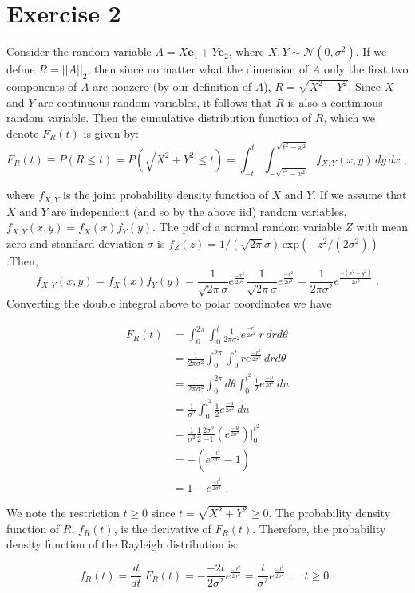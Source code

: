 \documentclass[11pt]{article}
\begin{document}
\section*{Exercise 2}

Consider the random variable $A = X\textbf{e}_1 + Y \textbf{e}_2$, where $X,Y \sim \mathcal{N}(0,\sigma^2)$. If we define $R = ||A||_2$, then since no matter what the dimension of $A$ only the first two components of $A$ are nonzero (by our definition of $A$), $R = \sqrt{X^2 + Y^2}$. Since $X$ and $Y$ are continuous random variables, it follows that $R$ is also a continuous random variable. Then the cumulative distribution function of $R$, which we denote $F_R(t)$ is given by:
$$F_R(t) \equiv P(R \leq t) = P(\sqrt{X^2 + Y^2} \leq t) = \int_{-t}^{t} \int_{-\sqrt{t^2-x^2}}^{\sqrt{t^2-x^2}} f_{X,Y}(x,y) \, dy \, dx \;,$$

where $f_{X,Y}$ is the joint probability density function of $X$ and $Y$. If we assume that $X$ and $Y$ are independent (and so by the above iid) random variables, $f_{X,Y}(x,y) = f_X(x)f_Y(y)$. The pdf of a normal random variable $Z$ with mean zero and standard deviation $\sigma$ is $f_Z(z) = 1/(\sqrt{2\pi}\sigma) \,\text{exp}(-z^2/(2\sigma^2))$.Then, $$f_{X,Y}(x,y) = f_X(x)f_Y(y) = \frac{1}{\sqrt{2\pi}\sigma} e^\frac{-x^2}{2\sigma^2} \frac{1}{\sqrt{2\pi}\sigma}e^\frac{-y^2}{2\sigma^2} = \frac{1}{2\pi\sigma^2}e^\frac{-(x^2+y^2)}{2\sigma^2} \; .$$
 Converting the double integral above to polar coordinates we have

\begin{align*}
F_R(t) &= \int_{0}^{2\pi} \int_{0}^{t} \frac{1}{2\pi\sigma^2} e^\frac{-r^2}{2\sigma^2} \, r \, dr d\theta\\
&= \frac{1}{2\pi \sigma^2}\int_{0}^{2\pi} \int_{0}^{t} r e^\frac{-r^2}{2\sigma^2}\, dr d\theta\\
&= \frac{1}{2\pi \sigma^2}\int_{0}^{2\pi} d\theta \int_{0}^{t^2} \frac{1}{2} e^\frac{-u}{2\sigma^2} \, du \\
&=\frac{1}{\sigma^2} \int_{0}^{t^2} \frac{1}{2} e^\frac{-u}{2\sigma^2} \, du \\
&= \frac{1}{\sigma^2}\frac{1}{2}\frac{2\sigma^2}{-1}\left(e^\frac{-u}{2\sigma^2}\right)\rvert_{0}^{t^2} \\
&= -\left(e^\frac{-t^2}{2\sigma^2} - 1\right)\\
&= 1 - e^\frac{-t^2}{2\sigma^2} \;.
\end{align*}

We note the restriction $t \geq 0$ since $t = \sqrt{X^2+Y^2} \geq 0$. The probability density function of $R$, $f_R(t)$, is the derivative of $F_R(t)$. Therefore, the probability density function of the Rayleigh distribution is:

$$ f_R(t) = \frac{d}{dt} \; F_R(t) = -\frac{-2t}{2\sigma^2}e^\frac{-t^2}{2\sigma^2} = \frac{t}{\sigma^2}e^\frac{-t^2}{2\sigma^2}\; , \quad t \geq 0 \;.$$
\end{document}
